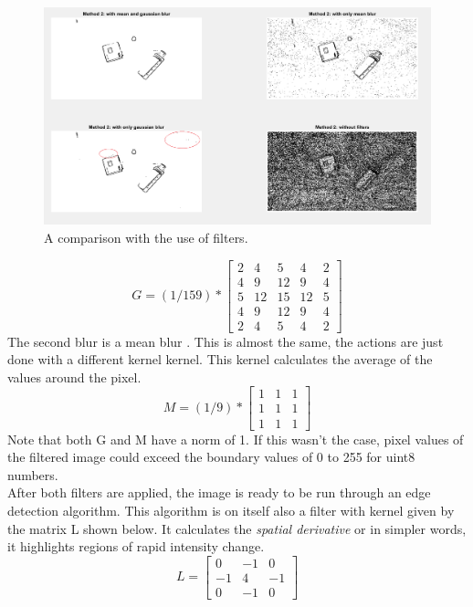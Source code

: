 \documentclass[11pt]{article}
\begin{document}
\begin{figure}[h]
\center
\includegraphics[width=0.7\linewidth]{filter_comparison.png}
\caption{A comparison with the use of filters.}
\label{fig:filter_comparison}
\end{figure}
\begin{equation}
G = (1/159) * 
\begin{bmatrix}
2 & 4 & 5 & 4 & 2\\
4 & 9 & 12 & 9 & 4\\
5 & 12 & 15 & 12 & 5\\
4 & 9 & 12 & 9& 4\\
2 & 4 & 5 & 4 & 2
\end{bmatrix}
\end{equation}
The second blur is a mean blur \cite{mean}. This is almost the same, the actions are just done with a different kernel kernel. This kernel calculates the average of the values around the pixel.
\begin{equation}
M = (1/9) * 
\begin{bmatrix}
1&1&1\\
1&1&1\\
1&1&1
\end{bmatrix}
\end{equation}
Note that both G and M have a norm of 1. If this wasn't the case, pixel values of the filtered image could exceed the boundary values of 0 to 255 for uint8 numbers. \\
After both filters are applied, the image is ready to be run through an edge detection algorithm\cite{edge_detection}. This algorithm is on itself also a filter with kernel given by the matrix L shown below.
It calculates the \textit{spatial derivative} or in simpler words, it highlights regions of rapid intensity change.
\begin{equation}
L =\begin{bmatrix}
0&-1&0\\
-1&4&-1\\
0&-1&0
\end{bmatrix}
\end{equation}
\end{document}
